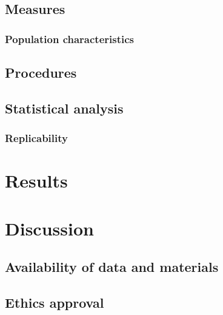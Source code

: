 \documentclass{article}
\begin{document}
\hypertarget{measures}{%
\subsection{Measures}\label{measures}}

\hypertarget{population-characteristics}{%
\subsubsection{Population characteristics}\label{population-characteristics}}

\hypertarget{procedures}{%
\subsection{Procedures}\label{procedures}}

\hypertarget{statistical-analysis}{%
\subsection{Statistical analysis}\label{statistical-analysis}}

\hypertarget{replicability}{%
\subsubsection{Replicability}\label{replicability}}

\hypertarget{results}{%
\section{Results}\label{results}}

\hypertarget{discussion}{%
\section{Discussion}\label{discussion}}

\hypertarget{availability-of-data-and-materials}{%
\subsection*{Availability of data and materials}\label{availability-of-data-and-materials}}

\hypertarget{ethics-approval}{%
\subsection*{Ethics approval}\label{ethics-approval}}
\end{document}
